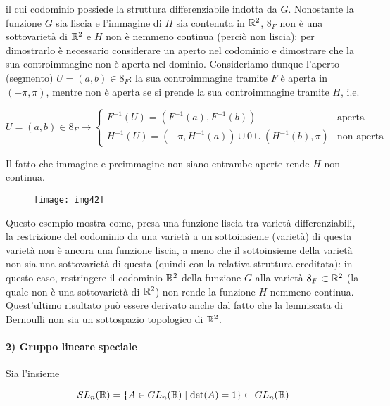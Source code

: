 il cui codominio possiede la struttura differenziabile indotta da $ G $. Nonostante la funzione $ G $ sia liscia e l'immagine di $ H $ sia contenuta in $ \mathbb{R}^{2} $, $ \mathfrak{8}_{F} $ non è una sottovarietà di $ \mathbb{R}^{2} $ e $ H $ non è nemmeno continua (perciò non liscia): per dimostrarlo è necessario considerare un aperto nel codominio e dimostrare che la sua controimmagine non è aperta nel dominio. Consideriamo dunque l'aperto (segmento) $ U = (a,b) \in \mathfrak{8}_{F} $: la sua controimmagine tramite $ F $ è aperta in $ (-\pi,\pi) $, mentre non è aperta se si prende la sua controimmagine tramite $ H $, i.e.

\begin{equation}
	U = (a,b) \in \mathfrak{8}_{F}%
	\rightarrow%
	\begin{cases}
		F^{-1}(U) = (F^{-1}(a),F^{-1}(b)) & \text{aperta}\\
		H^{-1}(U) = (-\pi,H^{-1}(a)) \cup 0 \cup (H^{-1}(b),\pi) & \text{non aperta}
	\end{cases}
\end{equation}

Il fatto che immagine e preimmagine non siano entrambe aperte rende $ H $ non continua.

\begin{figure}[H]
	\centering
	\texttt{[image: img42]}
\end{figure}

Questo esempio mostra come, presa una funzione liscia tra varietà differenziabili, la restrizione del codominio da una varietà a un sottoinsieme (varietà) di questa varietà non è ancora una funzione liscia, a meno che il sottoinsieme della varietà non sia una sottovarietà di questa (quindi con la relativa struttura ereditata): in questo caso, restringere il codominio $ \mathbb{R}^{2} $ della funzione $ G $ alla varietà $ \mathfrak{8}_{F} \subset \mathbb{R}^{2} $ (la quale non è una sottovarietà di $ \mathbb{R}^{2} $) non rende la funzione $ H $ nemmeno continua. Quest'ultimo risultato può essere derivato anche dal fatto che la lemniscata di Bernoulli non sia un sottospazio topologico di $ \mathbb{R}^{2} $.

\paragraph{2) Gruppo lineare speciale}\label{ex-slnr}

Sia l'insieme

\begin{equation}
	SL_{n}(\mathbb{R}) = \{ A \in GL_{n}(\mathbb{R}) \mid \det(A)=1 \} \subset GL_{n}(\mathbb{R})
\end{equation}

